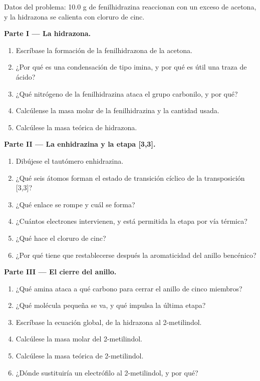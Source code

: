 \begin{problem}
\label{pb:b3:heterocycles:1}
Datos del problema: 10.0 g de fenilhidrazina reaccionan con un exceso de acetona, y
la hidrazona se calienta con cloruro de cinc.

\medskip\noindent\textbf{Parte I --- La hidrazona.}
\begin{enumerate}
  \item Escríbase la formación de la fenilhidrazona de la acetona.
  \item ¿Por qué es una condensación de tipo imina, y por qué es útil una traza de ácido?
  \item ¿Qué nitrógeno de la fenilhidrazina ataca el grupo carbonilo, y por qué?
  \item Calcúlense la masa molar de la fenilhidrazina y la cantidad usada.
  \item Calcúlese la masa teórica de hidrazona.
\end{enumerate}

\medskip\noindent\textbf{Parte II --- La enhidrazina y la etapa [3,3].}
\begin{enumerate}[resume]
  \item Dibújese el tautómero enhidrazina.
  \item ¿Qué seis átomos forman el estado de transición cíclico de la transposición [3,3]?
  \item ¿Qué enlace se rompe y cuál se forma?
  \item ¿Cuántos electrones intervienen, y está permitida la etapa por vía térmica?
  \item ¿Qué hace el cloruro de cinc?
  \item ¿Por qué tiene que restablecerse después la aromaticidad del anillo bencénico?
\end{enumerate}

\medskip\noindent\textbf{Parte III --- El cierre del anillo.}
\begin{enumerate}[resume]
  \item ¿Qué amina ataca a qué carbono para cerrar el anillo de cinco miembros?
  \item ¿Qué molécula pequeña se va, y qué impulsa la última etapa?
  \item Escríbase la ecuación global, de la hidrazona al 2-metilindol.
  \item Calcúlese la masa molar del 2-metilindol.
  \item Calcúlese la masa teórica de 2-metilindol.
  \item ¿Dónde sustituiría un electrófilo al 2-metilindol, y por qué?
\end{enumerate}


\end{problem}
